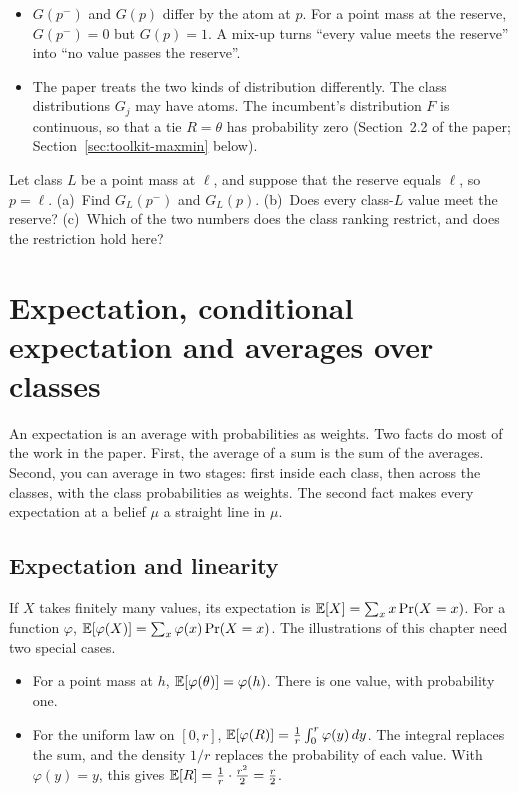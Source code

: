 \begin{watchout}
\begin{itemize}
\item \(G(p^-)\) and \(G(p)\) differ by the atom at \(p\). For a point mass at the reserve, \(G(p^-)=0\) but
\(G(p)=1\). A mix-up turns ``every value meets the reserve'' into ``no value passes the reserve''.
\item The paper treats the two kinds of distribution differently. The class distributions \(G_j\) may have atoms.
The incumbent's distribution \(F\) is continuous, so that a tie \(R=\theta\) has probability zero
(Section~2.2 of the paper; Section~\ref{sec:toolkit-maxmin} below).
\end{itemize}
\end{watchout}

\begin{checkyourself}\label{q:toolkit-cdf}
Let class \(L\) be a point mass at \(\ell\), and suppose that the reserve equals \(\ell\), so \(p=\ell\).
(a)~Find \(G_L(p^-)\) and \(G_L(p)\).
(b)~Does every class-\(L\) value meet the reserve?
(c)~Which of the two numbers does the class ranking restrict, and does the restriction hold here?
\end{checkyourself}

\section{Expectation, conditional expectation and averages over classes}\label{sec:toolkit-expectation}

\begin{intuition}
An expectation is an average with probabilities as weights. Two facts do most of the work in the paper. First,
the average of a sum is the sum of the averages. Second, you can average in two stages: first inside each class,
then across the classes, with the class probabilities as weights. The second fact makes every expectation at a
belief \(\mu\) a straight line in \(\mu\).
\end{intuition}

\subsection{Expectation and linearity}

If \(X\) takes finitely many values, its expectation is \(\mathbb{E}[X]=\sum_x x\Pr(X=x)\). For a function \(\varphi\),
\(\mathbb{E}[\varphi(X)]=\sum_x\varphi(x)\Pr(X=x)\). The illustrations of this chapter need two special cases.
\begin{itemize}
\item For a point mass at \(h\), \(\mathbb{E}[\varphi(\theta)]=\varphi(h)\). There is one value, with probability one.
\item For the uniform law on \([0,r]\), \(\mathbb{E}[\varphi(R)]=\frac1r\int_0^r\varphi(y)\,dy\). The integral replaces
the sum, and the density \(1/r\) replaces the probability of each value. With \(\varphi(y)=y\), this gives
\(\mathbb{E}[R]=\frac1r\cdot\frac{r^2}2=\frac r2\).
\end{itemize}

